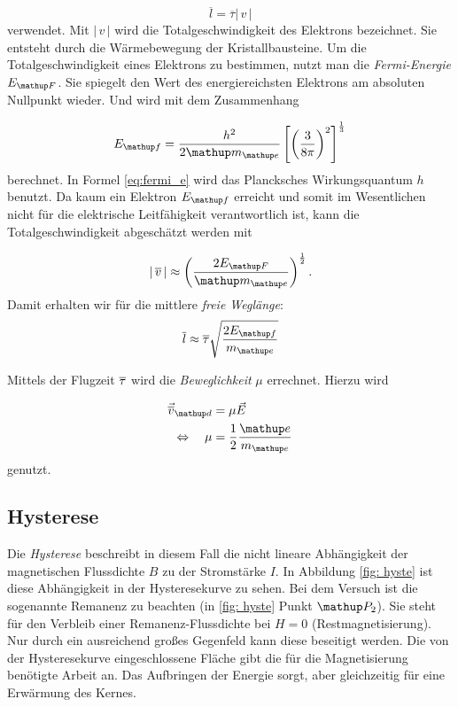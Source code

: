 \begin{equation*}
\label{eq:freie_weg}
\overline{l}=\overline{\tau}\left|\,v\,\right|
\end{equation*}
verwendet.
Mit $\left|\,v\,\right|$ wird die Totalgeschwindigkeit des Elektrons bezeichnet.
Sie entsteht durch die Wärmebewegung der Kristallbausteine.
Um die Totalgeschwindigkeit eines Elektrons zu bestimmen, nutzt
man die \emph{Fermi-Energie} $E\ua{F}$. Sie spiegelt den Wert des energiereichsten Elektrons am absoluten Nullpunkt wieder.
Und wird mit dem Zusammenhang %

\begin{equation}
\label{eq:fermi_e}
E\ua{f}=\frac{h^2}{2\map{m}\ua{e}}\left[\left(\frac{3}{8\pi}\right)^2\right]^{\frac{1}{3}}
\end{equation}
berechnet. In Formel \eqref{eq:fermi_e} wird das Plancksches Wirkungsquantum $h$ benutzt.
Da kaum ein Elektron $E\ua{f}$ erreicht und somit im Wesentlichen nicht
für die elektrische Leitfähigkeit verantwortlich ist, %
kann die Totalgeschwindigkeit abgeschätzt werden mit %

\begin{equation}
\label{eq:total_v}
\left|\,\overline{v}\,\right|\approx\left(\frac{2E\ua{F}}{\map{m}\ua{e}}\right)^{\frac{1}{2}}.
\end{equation}
Damit erhalten wir für die  mittlere \emph{freie Weglänge}:
\begin{equation}
\label{eq:mit_frei_weg}
\overline{l}\approx\overline{\tau}\sqrt{\frac{2E\ua{f}}{m\ua{e}}}
\end{equation}

Mittels der Flugzeit $\overline{\tau}$ wird die \emph{Beweglichkeit} $\mu$ errechnet.
Hierzu wird  %

\begin{align}
\vec{\ov{v}}\ua{d}&=\mu\vec{E} \notag \\
\Leftrightarrow \quad \mu&=\frac{1}{2}\frac{\map{e}}{m\ua{e}} \label{eq:beweg}
\end{align}
genutzt.

\subsection{Hysterese}

Die \emph{Hysterese} beschreibt in diesem Fall die nicht lineare
Abhängigkeit der magnetischen Flussdichte $B$ zu der
Stromstärke $I$. In Abbildung \ref{fig: hyste} ist
diese Abhängigkeit in der Hysteresekurve zu sehen.
Bei dem Versuch ist die sogenannte Remanenz zu beachten (in \ref{fig: hyste} Punkt $\map{P}_2$). %
Sie steht für den Verbleib einer Remanenz-Flussdichte bei $H=0$ (Restmagnetisierung). %
Nur durch ein ausreichend großes Gegenfeld kann diese beseitigt werden. %
Die von der Hysteresekurve eingeschlossene Fläche gibt die für die Magnetisierung benötigte
Arbeit an. Das Aufbringen der Energie sorgt, aber gleichzeitig für eine Erwärmung des Kernes. %

